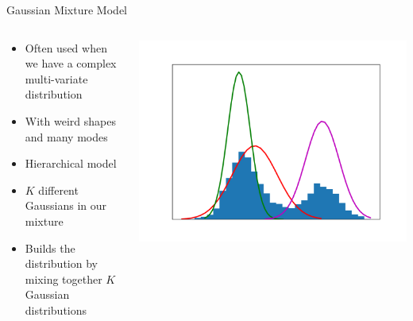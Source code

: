 \documentclass[aspectratio=169]{beamer}
\begin{document}
\begin{frame}{Gaussian Mixture Model}

\begin{columns}[T]
\begin{column}{0.5\textwidth}
\begin{itemize}
\item Often used when we have a complex multi-variate distribution
\item With weird shapes and many modes
\item Hierarchical model
\item $K$ different Gaussians in our mixture
\item Builds the distribution by mixing together $K$ Gaussian distributions
\end{itemize}
\end{column}
\begin{column}{0.5\textwidth}
\includegraphics[width=1\textwidth]{lectEM/gmm.png}
\end{column}
\end{columns}
\end{frame}
\end{document}
